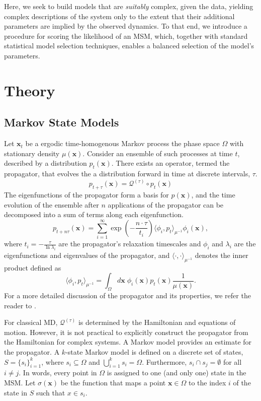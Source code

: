 \documentclass[journal=jpcbfk, layout=traditional, manuscript=article]{achemso}
\begin{document}
Here, we seek to build models that are \emph{suitably} complex, given the data, yielding complex descriptions of the system only to the extent that their additional parameters are implied by the observed dynamics. To that end, we introduce a procedure for scoring the likelihood of an MSM, which, together with standard statistical model selection techniques, enables a balanced selection of the model's parameters.

\section{Theory}
\subsection{Markov State Models}
Let $\mathbf{x}_t$ be a ergodic time-homogenous Markov process the phase space $\Omega$ with stationary density $\mu(\mathbf{x})$. Consider an ensemble of such processes at time $t$, described by a distribution $p_t(\mathbf{x})$. There exists an operator, termed the propagator, that evolves the a distribution forward in time at discrete intervals, $\tau$.
\begin{equation}
p_{t+\tau}(\mathbf{x}) = \mathcal{Q}^{(\tau)} \circ p_{t}(\mathbf{x})
\end{equation}
The eigenfunctions of the propagator form a basis for $p(\mathbf{x})$, and the time evolution of the ensemble after $n$ applications of the propagator can be decomposed into a sum of terms along each eigenfunction.
\begin{equation}
\label{eq:prop-timescales}
p_{t+n\tau}(\mathbf{x}) = \sum_{i=1}^\infty \exp\left(-\frac{n \cdot \tau}{t_i}\right) \langle \phi_i, p_t \rangle_{\mu^{-1}} \phi_i(\mathbf{x}),
\end{equation}
where $t_i = -\displaystyle\frac{\tau}{\ln \lambda_i}$ are the propagator's relaxation timescales and $\phi_i$ and $\lambda_i$ are the eigenfunctions and eigenvalues of the propagator, and $\langle \cdot, \cdot \rangle_{\mu^{-1}}$ denotes the inner product defined as
\begin{equation}
\langle \phi_i, p_t \rangle_{\mu^{-1}} = \int_\Omega d\mathbf{x}\; \phi_i(\mathbf{x}) p_t(\mathbf{x}) \frac{1}{\mu(\mathbf{x})}.
\end{equation}
For a more detailed discussion of the propagator and its properties, we refer the reader to \citet{Prinz2011Markov}.

For classical MD, $\mathcal{Q}^{(\tau)}$ is determined by the Hamiltonian and equations of motion\cite{Schutte2001Transfer}. However, it is not practical to explicitly construct the propagator from the Hamiltonian for complex systems. A Markov model provides an estimate for the propagator. A $k$-state Markov model is defined on a discrete set of states, $S = \{s_i\}_{i=1}^k$, where $s_i \subseteq \Omega$ and $\bigcup_{i=1}^k s_i = \Omega$. Furthermore, $s_i \cap s_j = \emptyset$ for all $i \neq j$. In words, every point in $\Omega$ is assigned to one (and only one) state in the MSM. Let $\sigma(\mathbf{x})$ be the function that maps a point $\mathbf{x} \in \Omega$ to the index $i$ of the state in $S$ such that $x \in s_i$.
\end{document}
